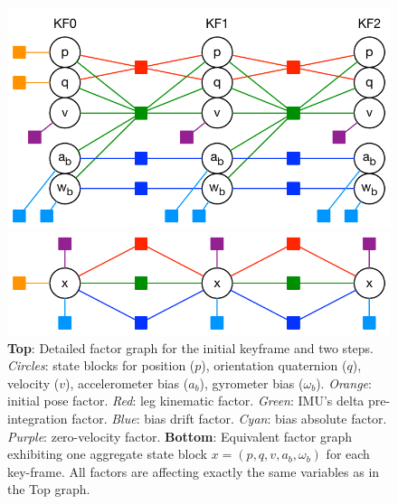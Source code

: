 \begin{figure}[tb]
\begin{center}
\includegraphics[scale=0.65]{figures/graph_exploded}
\par\vspace{4mm}
\includegraphics[scale=0.65]{figures/graph_essential}
\caption{
{\bf Top}: Detailed factor graph for the initial keyframe and two steps. \emph{Circles}: state blocks for position ($p$), orientation quaternion ($q$), velocity ($v$), accelerometer bias ($a_b$), gyrometer bias ($\omega_b$). \emph{Orange}: initial pose factor. \emph{Red}: leg kinematic factor. \emph{Green}: IMU's delta pre-integration factor. 
\emph{Blue}: bias drift factor. \emph{Cyan}: bias absolute factor. \emph{Purple}: zero-velocity factor. 
{\bf Bottom}: Equivalent factor graph exhibiting one aggregate state block $x=(p,q,v,a_b,\omega_b)$ for each key-frame. All factors are affecting exactly the same variables as in the Top graph.
}
\label{fig:factor_graph}
\end{center}
\end{figure}



